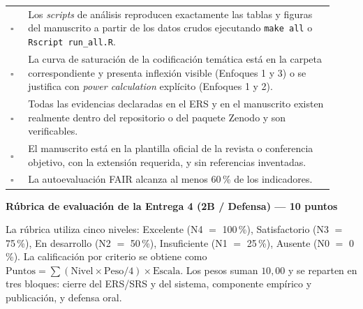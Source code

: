 \documentclass[11pt,a4paper]{article}
\newcounter{secc}
\newcommand{\secband}[1]{%
    \stepcounter{secc}\par\vspace{9pt}\noindent
    {\setlength{\fboxsep}{0pt}%
        \colorbox{uteqgold}{\parbox[c][20pt][c]{0.05\textwidth}{\centering\textbf{\color{white}\small \arabic{secc}}}}%
        \colorbox{uteqgreen}{\parbox[c][20pt][c]{0.95\textwidth}{\hspace{8pt}\textbf{\color{white}\small #1}}}%
    }\par\vspace{5pt}}
\begin{document}
\begin{longtable}{@{}p{0.05\linewidth} p{0.87\linewidth}@{}}
    $\square$ & Los \emph{scripts} de análisis reproducen exactamente las tablas y figuras del manuscrito a partir de los datos crudos ejecutando \texttt{make all} o \texttt{Rscript run\_all.R}.\\
    $\square$ & La curva de saturación de la codificación temática está en la carpeta correspondiente y presenta inflexión visible (Enfoques 1 y 3) o se justifica con \emph{power calculation} explícito (Enfoques 1 y 2).\\
    $\square$ & Todas las evidencias declaradas en el ERS y en el manuscrito existen realmente dentro del repositorio o del paquete Zenodo y son verificables.\\
    $\square$ & El manuscrito está en la plantilla oficial de la revista o conferencia objetivo, con la extensión requerida, y sin referencias inventadas.\\
    $\square$ & La autoevaluación FAIR alcanza al menos 60\,\% de los indicadores.\\
\end{longtable}
\secband{Rúbrica de evaluación de la Entrega 4 (2B / Defensa) --- 10 puntos}

La rúbrica utiliza cinco niveles: Excelente (N4 $=$ 100\,\%), Satisfactorio (N3 $=$ 75\,\%), En desarrollo (N2 $=$ 50\,\%), Insuficiente (N1 $=$ 25\,\%), Ausente (N0 $=$ 0\,\%).
La calificación por criterio se obtiene como $\text{Puntos} = \sum \left( \text{Nivel} \times \text{Peso} / 4 \right) \times \text{Escala}$.
Los pesos suman $10{,}00$ y se reparten en tres bloques: cierre del ERS/SRS y del sistema, componente empírico y publicación, y defensa oral.
\end{document}
